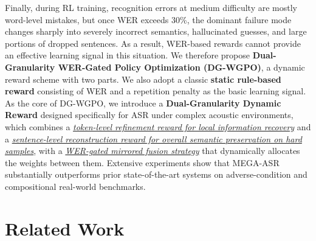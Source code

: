 \documentclass{article}
\begin{document}
Finally, during RL training, recognition errors at medium difficulty are mostly word-level mistakes, but once WER exceeds 30\%, the dominant failure mode changes sharply into severely incorrect semantics, hallucinated guesses, and large portions of dropped sentences. As a result, WER-based rewards cannot provide an effective learning signal in this situation. We therefore propose \textbf{Dual-Granularity WER-Gated Policy Optimization (DG-WGPO)}, a dynamic reward scheme with two parts. We also adopt a classic \textbf{static rule-based reward} consisting of WER and a repetition penalty as the basic learning signal. As the core of DG-WGPO, we introduce a \textbf{Dual-Granularity Dynamic Reward} designed specifically for ASR under complex acoustic environments, which combines a \underline{\textit{token-level refinement reward for local information recovery}} and a \underline{\textit{sentence-level reconstruction reward for overall semantic preservation on hard samples}}, with a \underline{\textit{WER-gated mirrored fusion strategy}} that dynamically allocates the weights between them. Extensive experiments show that MEGA-ASR substantially outperforms prior state-of-the-art systems on adverse-condition and compositional real-world benchmarks.

\vspace{-2mm}
\section{Related Work}
\vspace{-2mm}
\end{document}
